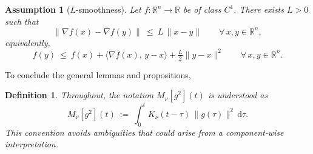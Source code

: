 \documentclass{article} %
\newtheorem{definition}{Definition}
\newtheorem{lemma}{Lemma}
\newtheorem{assumption}{Assumption}
\begin{document}


\begin{assumption}[\(L\)-smoothness]\label{ass:regularidad}
Let \(f:\mathbb{R}^n\to\mathbb{R}\) be of class \(C^1\). There exists \(L>0\) such that
\[
\|\nabla f(x)-\nabla f(y)\|\ \le\ L\,\|x-y\|\qquad \forall\,x,y\in\mathbb{R}^n,
\]
equivalently,
\[
f(y)\ \le\ f(x)+\langle \nabla f(x),\,y-x\rangle+\tfrac{L}{2}\|y-x\|^2\qquad \forall\,x,y\in\mathbb{R}^n.
\]
\end{assumption}

To conclude the general lemmas and propositions, 
\begin{definition}\label{def:M}
Throughout, the notation \(M_\nu[g^2](t)\) is understood as
\[
    M_\nu[g^2](t) \ :=\ \int_0^t K_\nu(t-\tau)\,\|g(\tau)\|^2\,\mathrm{d}\tau.
\]
This convention avoids ambiguities that could arise from a component-wise interpretation.
\end{definition}

\end{document}
